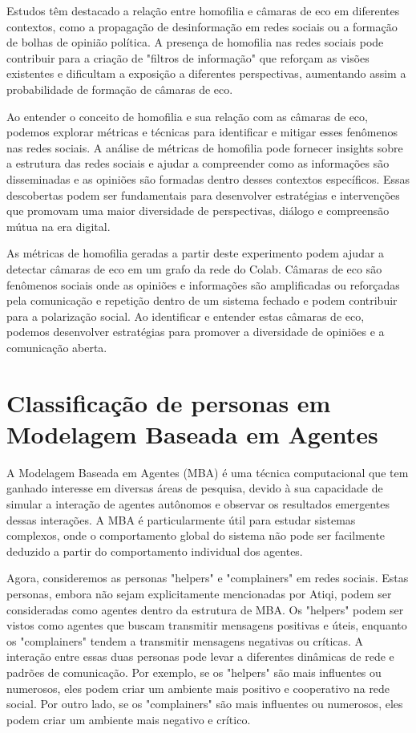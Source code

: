 Estudos têm destacado a relação entre homofilia e câmaras de eco em diferentes contextos, como a propagação de desinformação em redes sociais ou a formação de bolhas de opinião política. A presença de homofilia nas redes sociais pode contribuir para a criação de "filtros de informação" que reforçam as visões existentes e dificultam a exposição a diferentes perspectivas, aumentando assim a probabilidade de formação de câmaras de eco.

Ao entender o conceito de homofilia e sua relação com as câmaras de eco, podemos explorar métricas e técnicas para identificar e mitigar esses fenômenos nas redes sociais. A análise de métricas de homofilia pode fornecer insights sobre a estrutura das redes sociais e ajudar a compreender como as informações são disseminadas e as opiniões são formadas dentro desses contextos específicos. Essas descobertas podem ser fundamentais para desenvolver estratégias e intervenções que promovam uma maior diversidade de perspectivas, diálogo e compreensão mútua na era digital.

As métricas de homofilia geradas a partir deste experimento podem ajudar a detectar câmaras de eco em um grafo da rede do Colab. Câmaras de eco são fenômenos sociais onde as opiniões e informações são amplificadas ou reforçadas pela comunicação e repetição dentro de um sistema fechado e podem contribuir para a polarização social. Ao identificar e entender estas câmaras de eco, podemos desenvolver estratégias para promover a diversidade de opiniões e a comunicação aberta.

\section{Classificação de personas em Modelagem Baseada em Agentes}

A Modelagem Baseada em Agentes (MBA) é uma técnica computacional que tem ganhado interesse em diversas áreas de pesquisa, devido à sua capacidade de simular a interação de agentes autônomos e observar os resultados emergentes dessas interações. A MBA é particularmente útil para estudar sistemas complexos, onde o comportamento global do sistema não pode ser facilmente deduzido a partir do comportamento individual dos agentes.

Agora, consideremos as personas "helpers" e "complainers" em redes sociais. Estas personas, embora não sejam explicitamente mencionadas por Atiqi, podem ser consideradas como agentes dentro da estrutura de MBA. Os "helpers" podem ser vistos como agentes que buscam transmitir mensagens positivas e úteis, enquanto os "complainers" tendem a transmitir mensagens negativas ou críticas. A interação entre essas duas personas pode levar a diferentes dinâmicas de rede e padrões de comunicação. Por exemplo, se os "helpers" são mais influentes ou numerosos, eles podem criar um ambiente mais positivo e cooperativo na rede social. Por outro lado, se os "complainers" são mais influentes ou numerosos, eles podem criar um ambiente mais negativo e crítico. 

